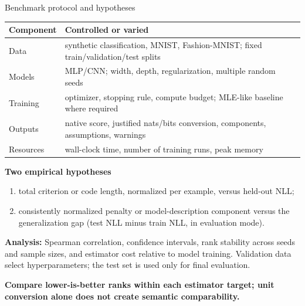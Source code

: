 \documentclass[aspectratio=169,notheorems]{beamer}
\newcommand{\take}[1]{%
  \par\vspace{0.35em}{\color{myblue}\hrule height 0.6pt}%
  \vspace{0.25em}\noindent\textbf{#1}\par}
\begin{document}
\begin{frame}[shrink=4]{Benchmark protocol and hypotheses}
\small
\renewcommand{\arraystretch}{1.13}
\begin{tabular}{@{}L{0.27\textwidth}L{0.67\textwidth}@{}}
\toprule
\textbf{Component} & \textbf{Controlled or varied} \\
\midrule
Data & synthetic classification, MNIST, Fashion-MNIST; fixed train/validation/test splits \\
Models & MLP/CNN; width, depth, regularization, multiple random seeds \\
Training & optimizer, stopping rule, compute budget; MLE-like baseline where required \\
Outputs & native score, justified nats/bits conversion, components, assumptions, warnings \\
Resources & wall-clock time, number of training runs, peak memory \\
\bottomrule
\end{tabular}

\medskip
\textbf{Two empirical hypotheses}
\begin{enumerate}\setlength{\itemsep}{0.2em}
  \item total criterion or code length, normalized per example, versus held-out NLL;
  \item consistently normalized penalty or model-description component versus the generalization gap
        (test NLL minus train NLL, in evaluation mode).
\end{enumerate}

\textbf{Analysis:} Spearman correlation, confidence intervals, rank stability across
seeds and sample sizes, and estimator cost relative to model training. Validation data
select hyperparameters; the test set is used only for final evaluation.

\take{Compare lower-is-better ranks within each estimator target; unit conversion alone
does not create semantic comparability.}
\end{frame}
\end{document}
